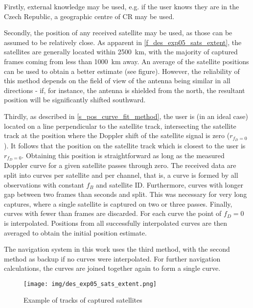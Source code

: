 Firstly, external knowledge may be used, e.g. if the user knows they are in the Czech Republic, a geographic centre of CR may be used.

Secondly, the position of any received satellite may be used, as those can be assumed to be relatively close. As apparent in \autoref{f_des_exp05_sats_extent}, the satellites are generally located within \qty{2500}{km}, with the majority of captured frames coming from less than \qty{1000}{km} away. An average of the satellite positions can be used to obtain a better estimate (see figure). However, the reliability of this method depends on the field of view of the antenna being similar in all directions - if, for instance, the antenna is shielded from the north, the resultant position will be significantly shifted southward.

Thirdly, as described in \autoref{s_pos_curve_fit_method}, the user is (in an ideal case) located on a line perpendicular to the satellite track, intersecting the satellite track at the position where the Doppler shift of the satellite signal is zero ($r_{f_D = 0}$). It follows that the position on the satellite track which is closest to the user is $r_{f_D = 0}$. Obtaining this position is straightforward as long as the measured Doppler curve for a given satellite passes through zero. The received data are split into curves per satellite and per channel, that is, a curve is formed by all observations with constant $f_B$ and satellite ID. Furthermore, curves with longer gap between two frames than  seconds and split. This was necessary for very long captures, where a single satellite is captured on two or three passes. Finally, curves with fewer than  frames are discarded. For each curve the point of $f_D = 0$ is interpolated. Positions from all successfully interpolated curves are then averaged to obtain the initial position estimate.

The navigation system in this work uses the third method, with the second method as backup if no curves were interpolated. %
For further navigation calculations, the curves are joined together again to form a single curve.


\begin{figure}
    \centering
    \texttt{[image: img/des\_exp05\_sats\_extent.png]}
    \caption{Example of tracks of captured satellites}
    \label{f_des_exp05_sats_extent}
\end{figure}


